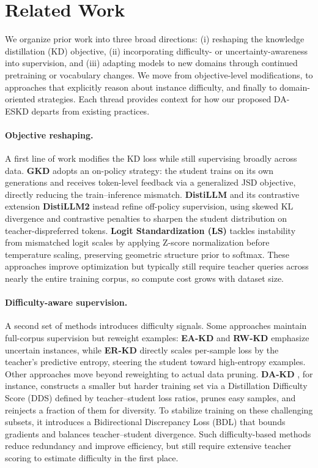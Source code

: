 \section{Related Work}

We organize prior work into three broad directions: (i) reshaping the knowledge distillation (KD) objective, (ii) incorporating difficulty- or uncertainty-awareness into supervision, and (iii) adapting models to new domains through continued pretraining or vocabulary changes. We move from objective-level modifications, to approaches that explicitly reason about instance difficulty, and finally to domain-oriented strategies. Each thread provides context for how our proposed DA-ESKD departs from existing practices.

\paragraph{Objective reshaping.}
A first line of work modifies the KD loss while still supervising broadly across data. 
\textbf{GKD} \cite{gkd} adopts an on-policy strategy: the student trains on its own generations and receives token-level feedback via a generalized JSD objective, directly reducing the train–inference mismatch. 
\textbf{DistiLLM} \cite{distillm} and its contrastive extension \textbf{DistiLLM2} \cite{ko2025distillm} instead refine off-policy supervision, using skewed KL divergence and contrastive penalties to sharpen the student distribution on teacher-dispreferred tokens. 
\textbf{Logit Standardization (LS)} \cite{ls} tackles instability from mismatched logit scales by applying Z-score normalization before temperature scaling, preserving geometric structure prior to softmax. 
These approaches improve optimization but typically still require teacher queries across nearly the entire training corpus, so compute cost grows with dataset size.

\paragraph{Difficulty-aware supervision.}
A second set of methods introduces difficulty signals. 
Some approaches maintain full-corpus supervision but reweight examples: \textbf{EA-KD} \cite{eakd} and \textbf{RW-KD} \cite{rwkd} emphasize uncertain instances, while \textbf{ER-KD} \cite{erkd} directly scales per-sample loss by the teacher’s predictive entropy, steering the student toward high-entropy examples. 
Other approaches move beyond reweighting to actual data pruning. 
\textbf{DA-KD} \cite{dakd}, for instance, constructs a smaller but harder training set via a Distillation Difficulty Score (DDS) defined by teacher–student loss ratios, prunes easy samples, and reinjects a fraction of them for diversity. To stabilize training on these challenging subsets, it introduces a Bidirectional Discrepancy Loss (BDL) that bounds gradients and balances teacher–student divergence. Such difficulty-based methods reduce redundancy and improve efficiency, but still require extensive teacher scoring to estimate difficulty in the first place.

